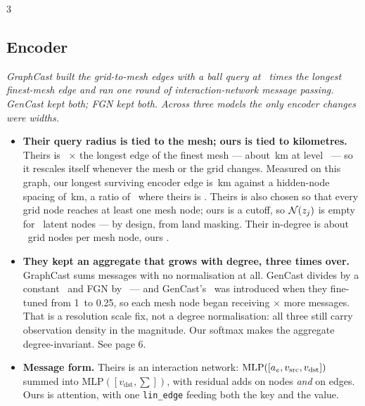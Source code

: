 \documentclass[11pt,landscape]{article}
\begin{document}
\medskip
\begin{multicols}{3}
\footnotesize\sloppy

\subsection*{Encoder}

\textit{GraphCast built the grid-to-mesh edges with a ball query at
\dmradiusfrac\ times the longest finest-mesh edge and ran one round of
interaction-network message passing.  GenCast kept both; FGN kept both.  Across
three models the only encoder changes were widths.}

\begin{itemize}[leftmargin=1.1em]\setlength{\itemsep}{0.45em}

  \item \textbf{Their query radius is tied to the mesh; ours is tied to
    kilometres.}  Theirs is \dmradiusfrac\ $\times$ the longest edge of the
    finest mesh --- about \dmradiuskm\,km at level \dmmeshlevel\ --- so it
    rescales itself whenever the mesh or the grid changes.  Measured on this
    graph, our longest surviving encoder edge is \valenccutoffkm\,km against a
    hidden-node spacing of \valhiddenspacing\,km, a ratio of
    \valcutoffratio\ where theirs is \dmradiusfrac.  Theirs is also chosen so
    that every grid node reaches at least one mesh node; ours is a cutoff, so
    $\mathcal{N}(z_j)$ is empty for \valdegzero\ latent nodes --- by design,
    from land masking.  Their in-degree is about \gcencdeg\ grid nodes per mesh
    node, ours \valdegmean.

  \item \textbf{They kept an aggregate that grows with degree, three times over.}
    GraphCast sums messages with no normalisation at all.  GenCast divides by a
    constant \genaggnorm\ and FGN by \fgnaggnorm\ --- and GenCast's
    \genaggnorm\ was introduced when they fine-tuned from 1\textdegree\ to
    0.25\textdegree, so each mesh node began receiving \genaggnorm$\times$ more
    messages.  That is a resolution scale fix, not a degree normalisation: all
    three still carry observation density in the magnitude.  Our softmax makes
    the aggregate degree-invariant.  See page 6.

  \item \textbf{Message form.}  Theirs is an interaction network:
    $\mathrm{MLP}([a_{e}, v_{\text{src}}, v_{\text{dst}}])$ summed into
    $\mathrm{MLP}([v_{\text{dst}}, \textstyle\sum])$, with residual adds on nodes
    \emph{and} on edges.  Ours is attention, with one {\tt lin\_edge} feeding both
    the key and the value.


\end{itemize}
\end{multicols}
\end{document}
